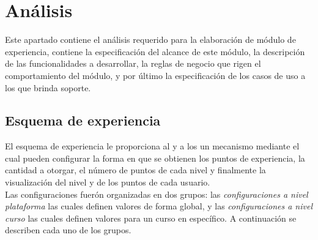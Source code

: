 
\chapter{Análisis}

 Este apartado contiene el análisis requerido para la elaboración de módulo de experiencia,
 contiene la especificación del alcance de este módulo, la descripción de las funcionalidades
 a desarrollar, la reglas de negocio que rigen el comportamiento del módulo, y por último la
 especificación de los casos de uso a los que brinda soporte.

\section{Esquema de experiencia}

 El esquema de experiencia le proporciona al  y a los  un mecanismo mediante el cual pueden configurar la forma en que se obtienen los puntos
 de experiencia, la cantidad a otorgar, el número de puntos de cada nivel y finalmente la
 visualización del nivel y de los puntos de cada usuario.\\

 \noindent 
 Las configuraciones fuerón organizadas en dos grupos: las {\it configuraciones a
 nivel plataforma} las cuales definen valores de forma global, y las {\it configuraciones a nivel curso}
 las cuales definen valores para un curso en específico. A continuación se describen cada uno de los
 grupos.\\


